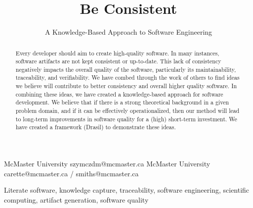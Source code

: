 \documentclass[preprint, 10pt]{sigplanconf}
\begin{document}
\setlength{\pdfpageheight}{\paperheight}
\setlength{\pdfpagewidth}{\paperwidth}




\title{Be Consistent}
\subtitle{A Knowledge-Based Approach to Software Engineering}

           {McMaster University}
           {szymczdm@mcmaster.ca}
           {McMaster University}
           {carette@mcmaster.ca / smiths@mcmaster.ca}

\maketitle

\begin{abstract}
Every developer should aim to create high-quality software. In many instances,
software artifacts are not kept consistent or up-to-date. This lack of
consistency negatively impacts the overall quality of the software, particularly
its maintainability, traceability, and verifiability. We have combed through the
work of others to find ideas we believe will contribute to better consistency
and overall higher quality software. In combining these ideas, we have created a
knowledge-based approach for software development. We believe that if there is a
strong theoretical background in a given problem domain, and if it can be
effectively operationalized, then our method will lead to long-term improvements
in software quality for a (high) short-term investment. We have created a
framework (Drasil) to demonstrate these ideas.
\end{abstract}



\keywords
Literate software, knowledge capture, traceability, software engineering, scientific 
computing, artifact generation, software quality
\end{document}
